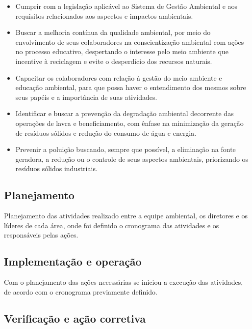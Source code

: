 \documentclass[a4paper, 12pt]{article}
\begin{document}
    \begin{itemize}
        \item Cumprir com a legislação aplicável ao Sistema de Gestão Ambiental e aos requisitos relacionados aos aspectos e impactos ambientais.
        \item Buscar a melhoria contínua da qualidade ambiental, por meio do envolvimento de seus colaboradores na conscientização ambiental com ações no processo educativo, despertando o interesse pelo meio ambiente que incentive à
        reciclagem e evite o desperdício dos recursos naturais.
        \item Capacitar os colaboradores com relação à gestão do meio ambiente e educação ambiental, para que possa haver o entendimento dos mesmos sobre seus papéis e a importância de suas atividades.
        \item Identificar e buscar a prevenção da degradação ambiental decorrente das operações de lavra e beneficiamento, com ênfase na minimização da geração
        de resíduos sólidos e redução do consumo de água e energia.
        \item Prevenir a poluição buscando, sempre que possível, a eliminação na fonte geradora, a redução ou o controle de seus aspectos ambientais, priorizando os resíduos sólidos industriais.
    \end{itemize}

    \subsection{Planejamento}
    
    \par Planejamento das atividades realizado entre a equipe ambiental, os diretores e os líderes de cada área, onde foi definido o cronograma das atividades e os responsáveis pelas ações.

    \subsection{Implementação e operação}

    \par Com o planejamento das ações necessárias se iniciou a execução das atividades, de acordo com o cronograma previamente definido.

    \subsection{Verificação e ação corretiva}
\end{document}
